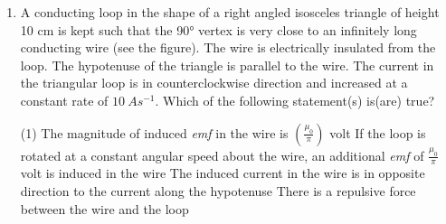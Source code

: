 
\begin{enumerate}
    \item A conducting loop in the shape of a right angled isosceles triangle of height 10 cm is kept such that the 90° vertex is very close to an infinitely long conducting wire (see the figure). The wire is electrically insulated from the loop. The hypotenuse of the triangle is parallel to the wire. The current in the triangular loop is in counterclockwise direction and increased at a constant rate of \(10\ As^{-1}\). Which of the following statement(s) is(are) true?
        \begin{tasks}(1)
            \task The magnitude of induced \emph{emf} in the wire is \(\left(\frac{\mu_0}{\pi}\right)\) volt
            \task If the loop is rotated at a constant angular speed about the wire, an additional \emph{emf} of \(\frac{\mu_0}{\pi}\) volt is induced in the wire
            \task The induced current in the wire is in opposite direction to the current along the hypotenuse
            \task There is a repulsive force between the wire and the loop
        \end{tasks}
\end{enumerate}
\begin{center}
\end{center}
